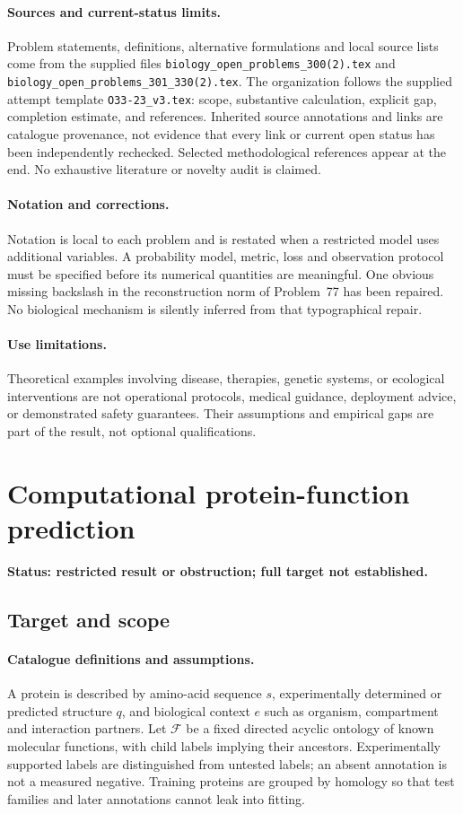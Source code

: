 \documentclass[11pt]{article}
\begin{document}
\paragraph{Sources and current-status limits.}
Problem statements, definitions, alternative formulations and local source lists
come from the supplied files
\texttt{biology\_open\_problems\_300(2).tex} and
\texttt{biology\_open\_problems\_301\_330(2).tex}.
The organization follows the supplied attempt template
\texttt{O33-23\_v3.tex}: scope, substantive calculation, explicit gap,
completion estimate, and references. Inherited source annotations and links are
catalogue provenance, not evidence that every link or current open status has
been independently rechecked. Selected methodological references appear at the
end. No exhaustive literature or novelty audit is claimed.

\paragraph{Notation and corrections.}
Notation is local to each problem and is restated when a restricted model uses
additional variables. A probability model, metric, loss and observation protocol
must be specified before its numerical quantities are meaningful. One obvious
missing backslash in the reconstruction norm of Problem~77 has been repaired.
No biological mechanism is silently inferred from that typographical repair.

\paragraph{Use limitations.}
Theoretical examples involving disease, therapies, genetic systems, or ecological
interventions are not operational protocols, medical guidance, deployment advice,
or demonstrated safety guarantees. Their assumptions and empirical gaps are part
of the result, not optional qualifications.


\section*{Computational protein-function prediction}
\label{prob:061}
\noindent\textbf{Status: restricted result or obstruction; full target not established.}
\subsection{Target and scope}
\paragraph{Catalogue definitions and assumptions.}
A protein is described by amino-acid sequence $s$, experimentally determined or predicted structure $q$, and biological context $e$ such as organism, compartment and interaction partners. Let $\mathcal F$ be a fixed directed acyclic ontology of known molecular functions, with child labels implying their ancestors. Experimentally supported labels are distinguished from untested labels; an absent annotation is not a measured negative. Training proteins are grouped by homology so that test families and later annotations cannot leak into fitting.
\end{document}
